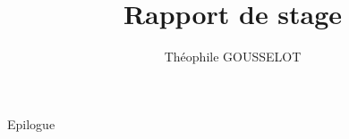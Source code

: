 \documentclass[a4paper,11pt, openany]{book}
\title{Rapport de stage}
\author{Théophile \textsc{GOUSSELOT}}
\begin{document}

\onehalfspacing %


\renewcommand{\contentsname}{Sommaire}
\frontmatter





\mainmatter





\cite{blessure_violon}

\appendix
 

\backmatter



Epilogue

\listoffigures
\listoftables
\end{document}
